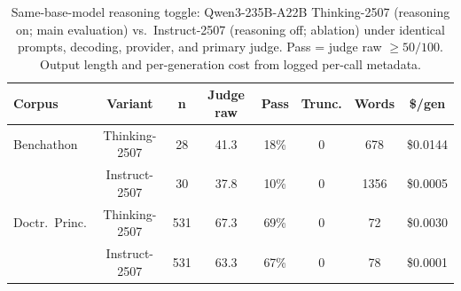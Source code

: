 \begin{table}[t]
\centering\footnotesize
\caption{Same-base-model reasoning toggle: Qwen3-235B-A22B Thinking-2507 (reasoning on; main evaluation) vs.\ Instruct-2507 (reasoning off; ablation) under identical prompts, decoding, provider, and primary judge. Pass = judge raw $\geq 50/100$. Output length and per-generation cost from logged per-call metadata.}
\label{tbl-reasoning-ablation}
\setlength{\tabcolsep}{4pt}
\begin{tabular*}{\textwidth}{@{\extracolsep{\fill}}lccccccc@{}}
\toprule
Corpus & Variant & n & Judge raw & Pass & Trunc. & Words & \$/gen \\
\midrule
Benchathon & Thinking-2507 & 28 & 41.3 & 18\% & 0 & 678 & \$0.0144 \\
 & Instruct-2507 & 30 & 37.8 & 10\% & 0 & 1356 & \$0.0005 \\
Doctr.\ Princ. & Thinking-2507 & 531 & 67.3 & 69\% & 0 & 72 & \$0.0030 \\
 & Instruct-2507 & 531 & 63.3 & 67\% & 0 & 78 & \$0.0001 \\
\bottomrule
\end{tabular*}
\end{table}
